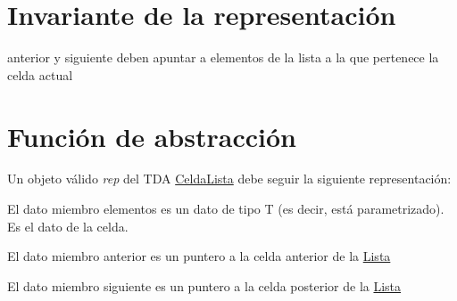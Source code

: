 \hypertarget{repCeldaLista_invCeldaLista}{}\section{Invariante de la representación}\label{repCeldaLista_invCeldaLista}

\begin{DoxyItemize}
\item anterior y siguiente deben apuntar a elementos de la lista a la que pertenece la celda actual 
\end{DoxyItemize}\hypertarget{repCeldaLista_faCeldaLista}{}\section{Función de abstracción}\label{repCeldaLista_faCeldaLista}
Un objeto válido {\itshape rep} del T\+DA \mbox{\hyperlink{structCeldaLista}{Celda\+Lista}} debe seguir la siguiente representación\+:
\begin{DoxyItemize}
\item El dato miembro elementos es un dato de tipo T (es decir, está parametrizado). Es el dato de la celda.
\item El dato miembro anterior es un puntero a la celda anterior de la \mbox{\hyperlink{classLista}{Lista}}
\item El dato miembro siguiente es un puntero a la celda posterior de la \mbox{\hyperlink{classLista}{Lista}} 
\end{DoxyItemize}